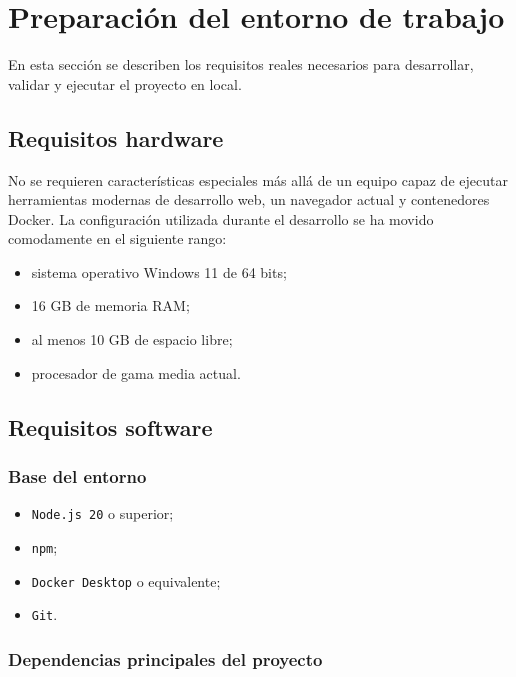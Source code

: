 \section{Preparación del entorno de trabajo}

En esta sección se describen los requisitos reales necesarios para desarrollar, validar y ejecutar el proyecto en local.

\subsection{Requisitos hardware}

No se requieren características especiales más allá de un equipo capaz de ejecutar herramientas modernas de desarrollo web, un navegador actual y contenedores Docker. La configuración utilizada durante el desarrollo se ha movido comodamente en el siguiente rango:

\begin{itemize}
    \item sistema operativo Windows 11 de 64 bits;
    \item 16 GB de memoria RAM;
    \item al menos 10 GB de espacio libre;
    \item procesador de gama media actual.
\end{itemize}

\subsection{Requisitos software}

\subsubsection*{Base del entorno}

\begin{itemize}
    \item \texttt{Node.js 20} o superior;
    \item \texttt{npm};
    \item \texttt{Docker Desktop} o equivalente;
    \item \texttt{Git}.
\end{itemize}

\subsubsection*{Dependencias principales del proyecto}

